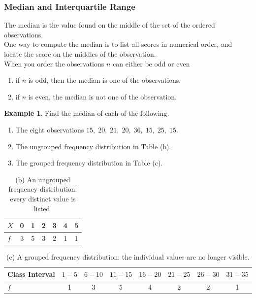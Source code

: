 \documentclass[11pt,a4paper]{article}
\theoremstyle{definition}
\newtheorem{example}[thm]{Example}
\begin{document}
\subsubsection{Median and Interquartile Range}

The median is the value found on the middle  of the set of the ordered observations.\\ 
One way to compute the median is to list all scores in numerical order, and locate the score on the middles of the observation.\\ When you order the observations $n$ can either be odd or even
\begin{enumerate}
    \item if $n$ is odd, then the median is one of the observations.
    \item if $n$ is even, the median is not one of the observation.\\
\end{enumerate}


\begin{example}
Find the median of each of the following.
\begin{enumerate}
\item[(a)] The eight observations $15,\; 20,\; 21,\; 20,\; 36,\; 15,\; 25,\; 15$.
\item[(b)] The ungrouped frequency distribution in Table (b).
\item[(c)] The grouped frequency distribution in Table (c).
\end{enumerate}

\begin{table}[H]
\centering
\begin{tabular}{|l|c|c|c|c|c|c|}
\hline
$X$ & 0 & 1 & 2 & 3 & 4 & 5\\
\hline
$f$ & 3 & 5 & 3 & 2 & 1 & 1\\
\hline
\end{tabular}
\caption{(b) An ungrouped frequency distribution: every distinct value is listed.}
\end{table}

\begin{table}[H]
\centering
\begin{tabular}{|l|c|c|c|c|c|c|c|}
\hline
Class Interval & $1-5$ & $6-10$ & $11-15$ & $16-20$ & $21-25$ & $26-30$ & $31-35$\\
\hline
$f$ & 1 & 3 & 5 & 4 & 2 & 2 & 1\\
\hline
\end{tabular}
\caption{(c) A grouped frequency distribution: the individual values are no longer visible.}
\end{table}
\end{example}
\end{document}
